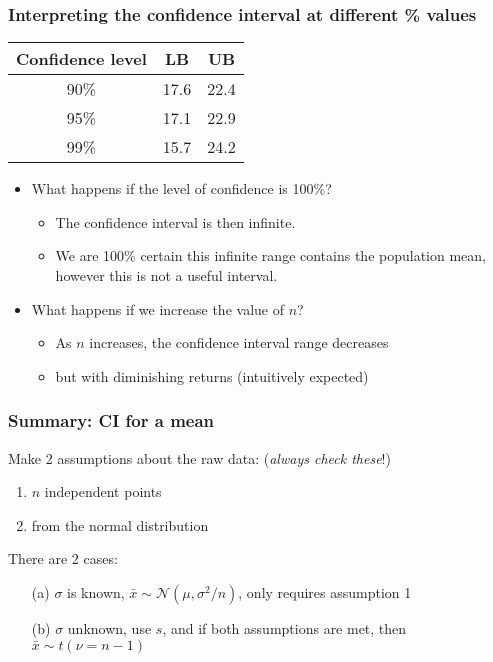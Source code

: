 \begin{frame}\frametitle{Interpreting the confidence interval at different \% values}

	\begin{center}
		\begin{tabular}{c|cc}
			\textbf{Confidence level} & \textbf{LB} & \textbf{UB}\\ \hline
			90\%	& 17.6	&	22.4\\
			95\%	& 17.1	&	22.9\\
			99\%	& 15.7	&	24.2\\
		\end{tabular}
	\end{center}
	\begin{itemize}
		\item	What happens if the level of confidence is 100\%?
		\begin{itemize}
			\item	The confidence interval is then infinite.
			\item	We are 100\% certain this infinite range contains the population mean, however this is not a useful interval.
		\end{itemize}
		\item	What happens if we increase the value of $n$?
		\begin{itemize}
			\item	As $n$ increases, the confidence interval range decreases
			\item	but with diminishing returns (intuitively expected)
		\end{itemize}
	\end{itemize}
\end{frame}

\begin{frame}\frametitle{Summary: CI for a mean}

	Make 2 assumptions about the raw data: (\emph{always check these}!)
	\begin{enumerate}
		\item	$n$ independent points \hfill {\color{myOrange}{$\longleftarrow$ this assumption is always required}}
		\item	from the normal distribution \hfill {\color{myOrange}{$\longleftarrow$ not required if $\sigma$ known}}
	\end{enumerate}

	\vspace{12pt}

	There are 2 cases:
	\begin{enumerate}
		\item[(a)]	$\sigma$ is known, $\bar{x} \sim \mathcal{N}(\mu, \sigma^2/n)$, only requires assumption 1
		\item[(b)]	$\sigma$ unknown, use $s$, and if both assumptions are met, then $\bar{x} \sim t(\nu = n-1)$
	\end{enumerate}
\end{frame}

